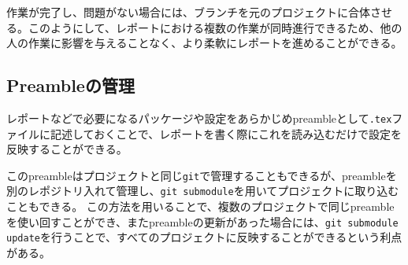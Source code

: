 作業が完了し、問題がない場合には、ブランチを元のプロジェクトに合体させる。このようにして、レポートにおける複数の作業が同時進行できるため、他の人の作業に影響を与えることなく、より柔軟にレポートを進めることができる。

\subsection{Preambleの管理}
レポートなどで必要になるパッケージや設定をあらかじめpreambleとして\verb|.tex|ファイルに記述しておくことで、レポートを書く際にこれを読み込むだけで設定を反映することができる。

このpreambleはプロジェクトと同じ\verb|git|で管理することもできるが、preambleを別のレポジトリ入れて管理し、\verb|git submodule|を用いてプロジェクトに取り込むこともできる。
この方法を用いることで、複数のプロジェクトで同じpreambleを使い回すことができ、またpreambleの更新があった場合には、\verb|git submodule update|を行うことで、すべてのプロジェクトに反映することができるという利点がある。


